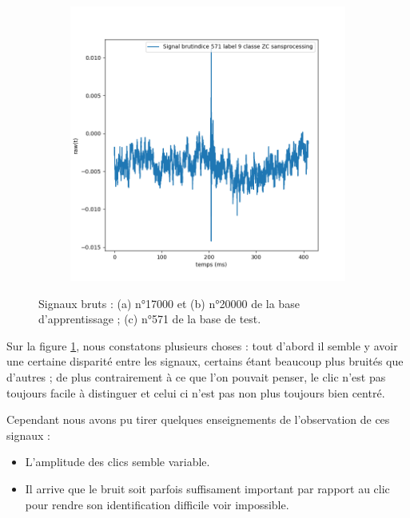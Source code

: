\begin{figure}[!h]
\begin{subfigure}[b]{0.3\textwidth}
	\caption{}
  	\end{subfigure}
  	\begin{subfigure}[b]{0.3\textwidth}
    \includegraphics[width=\textwidth]{./images/indice571Spectro1Dlabel9classeZCsansprocessingsanszoom.png}
    	\caption{}
	\end{subfigure}
\caption{Signaux bruts : (a) n°17000 et (b) n°20000 de la base d'apprentissage ; (c) n°571 de la base de test.%
\label{fig:signauxbruts}}
\end{figure}

Sur la figure \ref{fig:signauxbruts}, nous constatons plusieurs choses : tout d'abord il semble y avoir une certaine disparité entre les signaux, certains étant beaucoup plus bruités que d'autres ; de plus contrairement à ce que l'on pouvait penser, le clic n'est pas toujours facile à distinguer et celui ci n'est pas non plus toujours bien centré.

Cependant nous avons pu tirer quelques enseignements de l'observation de ces signaux :
\begin{itemize}
\item L'amplitude des clics semble variable.
\item Il arrive que le bruit soit parfois suffisament important par rapport au clic pour rendre son identification difficile voir impossible.
\end{itemize}

